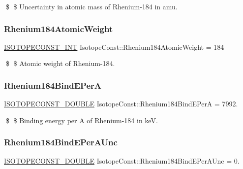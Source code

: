 \$ \$ Uncertainty in atomic mass of Rhenium-\/184 in amu. \mbox{\label{group___isotope_const-_rhenium-_re184_ga5d5ddc5e0d424d878ea7a5187b9ca8a6}} 
\subsubsection{\texorpdfstring{Rhenium184\+Atomic\+Weight}{Rhenium184AtomicWeight}}
{\footnotesize\ttfamily \mbox{\hyperlink{group___isotope_const-_macros_ga5f18360b3e99483a35c32d789e62621c}{I\+S\+O\+T\+O\+P\+E\+C\+O\+N\+S\+T\+\_\+\+I\+NT}} Isotope\+Const\+::\+Rhenium184\+Atomic\+Weight = 184}

\$ \$ Atomic weight of Rhenium-\/184. \mbox{\label{group___isotope_const-_rhenium-_re184_gacdefe3dbd39eb11bab25d0ddc67eead1}} 
\subsubsection{\texorpdfstring{Rhenium184\+Bind\+E\+PerA}{Rhenium184BindEPerA}}
{\footnotesize\ttfamily \mbox{\hyperlink{group___isotope_const-_macros_ga8f45a7272ce02c0b4c65c44636ed719a}{I\+S\+O\+T\+O\+P\+E\+C\+O\+N\+S\+T\+\_\+\+D\+O\+U\+B\+LE}} Isotope\+Const\+::\+Rhenium184\+Bind\+E\+PerA = 7992.}

\$ \$ Binding energy per A of Rhenium-\/184 in keV. \mbox{\label{group___isotope_const-_rhenium-_re184_ga8345648b037a75c3dd89edd56851f47b}} 
\subsubsection{\texorpdfstring{Rhenium184\+Bind\+E\+Per\+A\+Unc}{Rhenium184BindEPerAUnc}}
{\footnotesize\ttfamily \mbox{\hyperlink{group___isotope_const-_macros_ga8f45a7272ce02c0b4c65c44636ed719a}{I\+S\+O\+T\+O\+P\+E\+C\+O\+N\+S\+T\+\_\+\+D\+O\+U\+B\+LE}} Isotope\+Const\+::\+Rhenium184\+Bind\+E\+Per\+A\+Unc = 0.}

